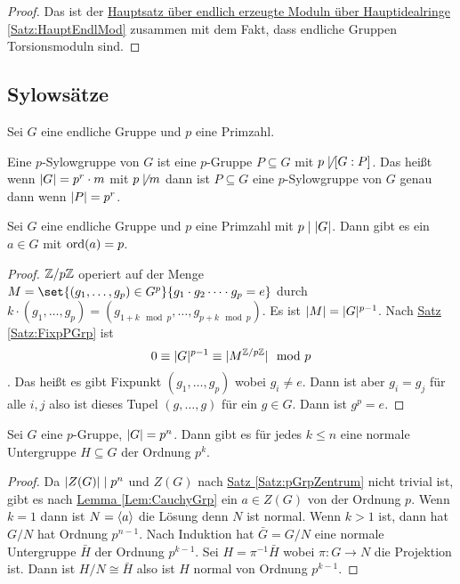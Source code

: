 \begin{proof}
    Das ist der \hyperref[Satz:HauptEndlMod]{Hauptsatz über endlich erzeugte Moduln über Hauptidealringe} \ref{Satz:HauptEndlMod} zusammen mit dem Fakt, dass endliche Gruppen Torsionsmoduln sind.
\end{proof}
\subsection{Sylowsätze}
Sei $G$ eine endliche Gruppe und $p$ eine Primzahl.
\begin{Def}
    Eine $p$-Sylowgruppe von $G$ ist eine $p$-Gruppe $P\subseteq G$ mit $p\not\mid[G:P]$. Das heißt wenn $\lvert G\rvert=p^r\cdot m$ mit $p\not\mid m$ dann ist $P\subseteq G$ eine $p$-Sylowgruppe von $G$ genau dann wenn $\lvert P\rvert=p^r$.
\end{Def}
\begin{Lemma}\label{Lem:CauchyGrp}
    Sei $G$ eine endliche Gruppe und $p$ eine Primzahl mit $p\mid \lvert G\rvert$. Dann gibt es ein $a\in G$ mit $\operatorname{ord}(a)=p$.
\end{Lemma}
\begin{proof}
    $\mathbb{Z}/p\mathbb{Z}$ operiert auf der Menge $M=\set{(g_1,\dots,g_p)\in G^p}{g_1\cdot g_2\dots \cdot g_p=e}$ durch $k\cdot (g_1,\dots,g_p)=(g_{1+k\mod p},\dots,g_{p+k\mod p})$. Es ist $\lvert M\rvert=\lvert G\rvert ^{p-1}$.
    Nach \hyperref[Satz:FixpPGrp]{ Satz \ref{Satz:FixpPGrp}} ist $$0\equiv \lvert G\rvert^{p-1}\equiv \lvert M^{\mathbb{Z}/p\mathbb{Z}}\rvert\mod p$$. Das heißt es gibt Fixpunkt $(g_1,\dots,g_p)$ wobei $g_i\neq e$.
    Dann ist aber $g_i=g_j$ für alle $i,j$ also ist dieses Tupel $(g,\dots ,g)$ für ein $g\in G$. Dann ist $g^p=e$.
\end{proof}
\begin{Kor}\label{Kor:NormIndex}
    Sei $G$ eine $p$-Gruppe, $\lvert G\rvert=p^n$. Dann gibt es für jedes $k\leq n$ eine normale Untergruppe $H\subseteq G$ der Ordnung $p^k$.
\end{Kor}
\begin{proof}
    Da $\lvert Z(G)\rvert\mid p^n$ und $Z(G)$ nach \hyperref[Satz:pGrpZentrum]{Satz \ref{Satz:pGrpZentrum}} nicht trivial ist, gibt es nach \hyperref[Lem:CauchyGrp]{Lemma \ref{Lem:CauchyGrp}} ein $a\in Z(G)$ von der Ordnung $p$. Wenn $k=1$ dann ist $N=\langle a\rangle$ die Lösung denn $N$ ist normal. Wenn $k>1$ ist, dann hat $G/N$ hat Ordnung $p^{n-1}$. Nach Induktion hat $\bar G=G/N$ eine normale Untergruppe $\bar H$ der Ordnung $p^{k-1}$. Sei $H=\pi^{-1}\bar H$ wobei $\pi\colon G\to N$ die Projektion ist. Dann ist $H/N\cong \bar H$ also ist $H$ normal von Ordnung $p^{k-1}$.
\end{proof}
